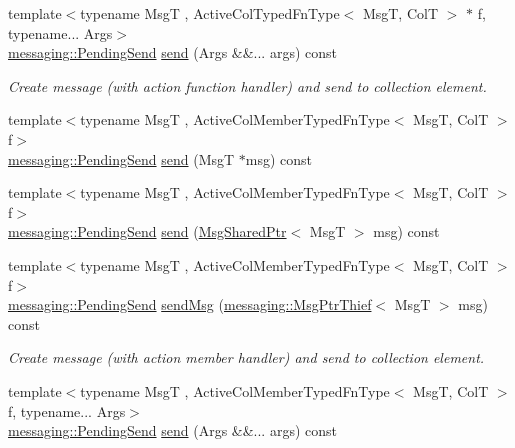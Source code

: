 \begin{DoxyCompactItemize}
{\footnotesize template$<$typename MsgT , Active\+Col\+Typed\+Fn\+Type$<$ Msg\+T, Col\+T $>$ $\ast$ f, typename... Args$>$ }\\\hyperlink{structvt_1_1messaging_1_1_pending_send}{messaging\+::\+Pending\+Send} \hyperlink{structvt_1_1vrt_1_1collection_1_1_sendable_a65e5494a18b398b52f12c056cff1dc16}{send} (Args \&\&... args) const
\begin{DoxyCompactList}\small\item\em Create message (with action function handler) and send to collection element. \end{DoxyCompactList}\item 
{\footnotesize template$<$typename MsgT , Active\+Col\+Member\+Typed\+Fn\+Type$<$ Msg\+T, Col\+T $>$ f$>$ }\\\hyperlink{structvt_1_1messaging_1_1_pending_send}{messaging\+::\+Pending\+Send} \hyperlink{structvt_1_1vrt_1_1collection_1_1_sendable_a321d85ceafaf6525875fb7468a80ac6d}{send} (MsgT $\ast$msg) const
\item 
{\footnotesize template$<$typename MsgT , Active\+Col\+Member\+Typed\+Fn\+Type$<$ Msg\+T, Col\+T $>$ f$>$ }\\\hyperlink{structvt_1_1messaging_1_1_pending_send}{messaging\+::\+Pending\+Send} \hyperlink{structvt_1_1vrt_1_1collection_1_1_sendable_aa8c102820895d01422c14e8c0993fc90}{send} (\hyperlink{namespacevt_ab2b3d506ec8e8d1540aede826d84a239}{Msg\+Shared\+Ptr}$<$ MsgT $>$ msg) const
\item 
{\footnotesize template$<$typename MsgT , Active\+Col\+Member\+Typed\+Fn\+Type$<$ Msg\+T, Col\+T $>$ f$>$ }\\\hyperlink{structvt_1_1messaging_1_1_pending_send}{messaging\+::\+Pending\+Send} \hyperlink{structvt_1_1vrt_1_1collection_1_1_sendable_a1bae1b58a1ce80fd76ee43ff4d33905a}{send\+Msg} (\hyperlink{structvt_1_1messaging_1_1_msg_ptr_thief}{messaging\+::\+Msg\+Ptr\+Thief}$<$ MsgT $>$ msg) const
\begin{DoxyCompactList}\small\item\em Create message (with action member handler) and send to collection element. \end{DoxyCompactList}\item 
{\footnotesize template$<$typename MsgT , Active\+Col\+Member\+Typed\+Fn\+Type$<$ Msg\+T, Col\+T $>$ f, typename... Args$>$ }\\\hyperlink{structvt_1_1messaging_1_1_pending_send}{messaging\+::\+Pending\+Send} \hyperlink{structvt_1_1vrt_1_1collection_1_1_sendable_a65e5494a18b398b52f12c056cff1dc16}{send} (Args \&\&... args) const

\end{DoxyCompactItemize}
